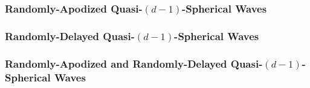 \subsubsection{Randomly-Apodized Quasi-$(d-1)$-Spherical Waves}


\subsubsection{Randomly-Delayed Quasi-$(d-1)$-Spherical Waves}
\label{subsubsec:syn_p_in_types_rnd_del}


\subsubsection{Randomly-Apodized and Randomly-Delayed Quasi-$(d-1)$-Spherical Waves}

